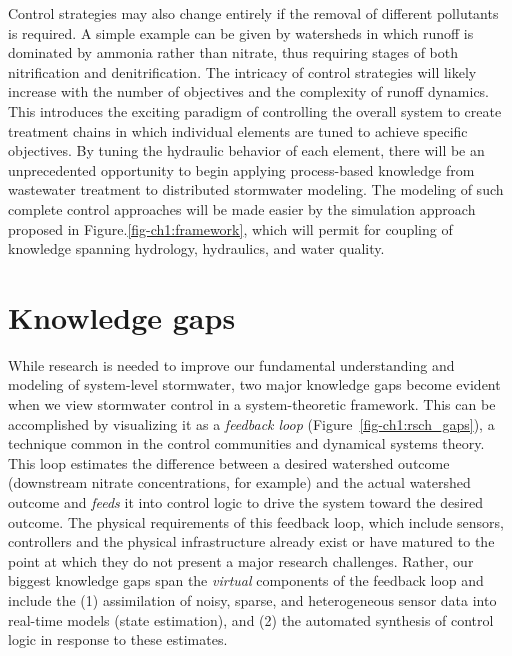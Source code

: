 Control strategies may also change entirely if the removal of different pollutants is required. 
A simple example can be given by watersheds in which runoff is dominated by ammonia rather than nitrate, thus requiring stages of both nitrification and denitrification. 
The intricacy of control strategies will likely increase with the
  number of objectives\cite{Tillinghast_2012} and the complexity of runoff dynamics. This introduces the exciting paradigm of controlling the overall system to create treatment chains in which individual elements are tuned to achieve specific objectives. 
By tuning the hydraulic behavior of each element, there will be an unprecedented opportunity to begin applying process-based knowledge from wastewater treatment to distributed stormwater modeling. 
The modeling of such complete control approaches will be made easier by the simulation approach proposed in Figure.\ref{fig-ch1:framework}, which will permit for coupling of knowledge spanning hydrology, hydraulics, and water quality.  


\section{Knowledge gaps}
While research is needed to improve our fundamental understanding and modeling of system-level stormwater, two major knowledge gaps become evident when we view stormwater control in a system-theoretic framework. This can be accomplished by visualizing it as a \textit{feedback loop} (Figure~\ref{fig-ch1:rsch_gaps}), a technique common in the control communities and dynamical systems theory\cite{Ogata201}. This loop estimates the difference between a desired watershed outcome (downstream nitrate concentrations, for example) and the actual watershed outcome and \textit{feeds} it into control logic to drive the system toward the desired outcome. The physical requirements of this feedback loop, which include sensors, controllers and the physical infrastructure already exist or have matured to the point at which they  do not present a major research challenges. Rather, our biggest knowledge gaps span the \textit{virtual} components of the feedback loop and include the (1) assimilation of noisy, sparse, and heterogeneous sensor data into real-time models (state estimation), and (2) the automated synthesis of control logic in response to these estimates. 


